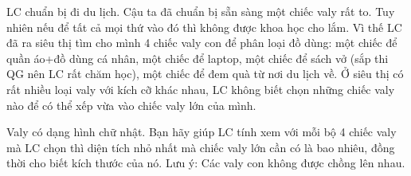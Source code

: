 LC chuẩn bị đi du lịch. Cậu ta đã chuẩn bị sẵn sàng một chiếc valy rất to. Tuy nhiên nếu để tất cả mọi thứ vào đó thì không được khoa học cho lắm. Vì thế LC đã ra siêu thị tìm cho mình 4 chiếc valy con để phân loại đồ dùng: một chiếc để quần áo+đồ dùng cá nhân, một chiếc để laptop, một chiếc để sách vở (sắp thi QG nên LC rất chăm học), một chiếc để đem quà từ nơi du lịch về. Ở siêu thị có rất nhiều loại valy với kích cỡ khác nhau, LC không biết chọn những chiếc valy nào để có thể xếp vừa vào chiếc valy lớn của mình.

Valy có dạng hình chữ nhật. Bạn hãy giúp LC tính xem với mỗi bộ 4 chiếc valy mà LC chọn thì diện tích nhỏ nhất mà chiếc valy lớn cần có là bao nhiêu, đồng thời cho biết kích thước của nó. Lưu ý: Các valy con không được chồng lên nhau.

\